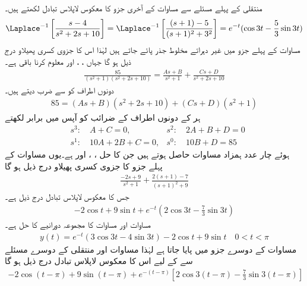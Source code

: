 منتقلی کے پہلے مسئلے سے مساوات  کے آخری جزو کا معکوس لاپلاس تبادل لکھتے ہیں۔
\begin{align}\label{مساوات_مثال_لاپلاس_نصف_لہر_ب}
\Laplace^{-1}\left[\frac{s-4}{s^2+2s+10}\right]=\Laplace^{-1}\left[\frac{(s+1)-5}{(s+1)^2+3^2}\right]=e^{-t}(\cos 3t-\frac{5}{3}\sin 3t)
\end{align}
مساوات  کے پہلے جزو میں غیر دہراتے مخلوط جذر پائے جاتے ہیں لہٰذا اس کا جزوی کسری پھیلاو درج ذیل ہو گا جہاں ، ،  اور  معلوم کرنا باقی ہے۔
\begin{align*}
\frac{85}{(s^2+1)(s^2+2s+10)}=\frac{As+B}{s^2+1}+\frac{Cs+D}{s^2+2s+10}
\end{align*}
دونوں اطراف کو  سے ضرب دیتے ہیں۔
\begin{align*}
85=(As+B)(s^2+2s+10)+(Cs+D)(s^2+1)
\end{align*}
ہر  کے دونوں اطراف کے ضرائب کو آپس میں برابر لکھتے
\begin{align*}
& s^3:\quad A+C=0, & s^2:\quad 2A+B+D=0\\
& s^1:\quad 10A+2B+C=0, & s^0:\quad 10B+D=85
\end{align*} 
ہوئے چار عدد ہمزاد مساوات حاصل ہوتے ہیں جن کا حل ، ،  اور  ہے۔یوں مساوات  کے پہلے جزو کا جزوی کسری پھیلاو درج ذیل ہو گا
\begin{align*}
\frac{-2s+9}{s^2+1}+\frac{2(s+1)-7}{(s+1)^2+9}
\end{align*}
جس کا معکوس لاپلاس تبادل درج ذیل ہے۔
\begin{align}\label{مساوات_مثال_لاپلاس_نصف_لہر_پ}
-2\cos t+9\sin t+e^{-t}(2\cos 3t-\frac{7}{3}\sin 3t)
\end{align}
مساوات  اور مساوات  کا مجموعہ  دورانیے کا حل ہے۔
\begin{align}\label{مساوات_مثال_لاپلاس_نصف_لہر_ت}
y(t)=e^{-t}(3\cos 3t-4\sin 3t)-2\cos t+9\sin t\quad 0<t<\pi
\end{align}
مساوات  کے دوسرے جزو میں   پایا جاتا ہے لہٰذا مساوات  اور منتقلی کے دوسرے مسئلے سے  کے لیے  اس کا معکوس لاپلاس تبادل درج ذیل ہو گا
\begin{align*}
-2\cos (t-\pi)+9\sin (t-\pi)+e^{-(t-\pi)}[2\cos 3(t-\pi)-\frac{7}{3}\sin 3(t-\pi)]
\end{align*}
